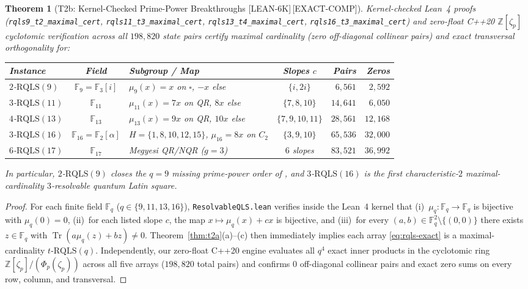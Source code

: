 \documentclass[11pt,reqno]{amsart}
\newtheorem{theorem}{Theorem}[section]
\theoremstyle{definition}
\newcommand{\ZZ}{\mathbb{Z}}
\newcommand{\FF}{\mathbb{F}}
\newcommand{\Tr}{\operatorname{Tr}}
\newcommand{\RQLS}{\mathrm{RQLS}}
\newcommand{\lid}[1]{{\footnotesize\nolinkurl{#1}}}
\newcommand{\tagL}{\textsf{\footnotesize[LEAN-6K]}}
\newcommand{\tagE}{\textsf{\footnotesize[EXACT-COMP]}}
\begin{document}
\begin{theorem}[T2b: Kernel-Checked Prime-Power Breakthroughs \tagL\,\tagE]
\label{thm:t2b}
Kernel-checked Lean~4 proofs (\lid{rqls9_t2_maximal_cert},
\lid{rqls11_t3_maximal_cert}, \lid{rqls13_t4_maximal_cert},
\lid{rqls16_t3_maximal_cert}) and zero-float C++20 $\ZZ[\zeta_p]$ cyclotomic
verification across all $198{,}820$ state pairs certify maximal cardinality (zero
off-diagonal collinear pairs) and exact transversal orthogonality for:
\begin{center}
\footnotesize
\setlength{\tabcolsep}{4pt}
\begin{tabularx}{\textwidth}{@{}l c >{\raggedright\arraybackslash}X c r r@{}}
\toprule
\textbf{Instance} & \textbf{Field} & \textbf{Subgroup / Map} & \textbf{Slopes $c$} & \textbf{Pairs} & \textbf{Zeros} \\
\midrule
$2$-$\RQLS(9)$ & $\FF_9 = \FF_3[i]$ & $\mu_9(x) = x$ on $\square$, $-x$ else & $\{i, 2i\}$ & $6{,}561$ & $2{,}592$ \\
$3$-$\RQLS(11)$ & $\FF_{11}$ & $\mu_{11}(x) = 7x$ on QR, $8x$ else & $\{7, 8, 10\}$ & $14{,}641$ & $6{,}050$ \\
$4$-$\RQLS(13)$ & $\FF_{13}$ & $\mu_{13}(x) = 9x$ on QR, $10x$ else & $\{7, 9, 10, 11\}$ & $28{,}561$ & $12{,}168$ \\
$3$-$\RQLS(16)$ & $\FF_{16} = \FF_2[\alpha]$ & $H = \{1,8,10,12,15\}$, $\mu_{16}=8x$ on $C_2$ & $\{3, 9, 10\}$ & $65{,}536$ & $32{,}000$ \\
$6$-$\RQLS(17)$ & $\FF_{17}$ & Megyesi QR/NQR ($g=3$) & $6$ slopes & $83{,}521$ & $36{,}992$ \\
\bottomrule
\end{tabularx}
\end{center}
In particular, $2$-$\RQLS(9)$ closes the $q=9$ missing prime-power order of
\cite{zhang2026rqls}, and $3$-$\RQLS(16)$ is the first characteristic-$2$ maximal-cardinality
$3$-resolvable quantum Latin square.
\end{theorem}

\begin{proof}
For each finite field $\FF_q$ ($q \in \{9, 11, 13, 16\}$), \lid{ResolvableQLS.lean}
verifies inside the Lean~4 kernel that (i)~$\mu_q : \FF_q \to \FF_q$ is bijective with
$\mu_q(0) = 0$, (ii)~for each listed slope $c$, the map $x \mapsto \mu_q(x) + c x$ is
bijective, and (iii)~for every $(a, b) \in \FF_q^2 \setminus \{(0,0)\}$ there exists
$z \in \FF_q$ with $\Tr(a \mu_q(z) + b z) \ne 0$. Theorem~\ref{thm:t2a}(a)--(c) then
immediately implies each array \eqref{eq:rqls-exact} is a maximal-cardinality
$t$-$\RQLS(q)$. Independently, our zero-float C++20 engine evaluates all $q^4$ exact inner
products in the cyclotomic ring $\ZZ[\zeta_p]/(\Phi_p(\zeta_p))$ across all five arrays
($198{,}820$ total pairs) and confirms $0$ off-diagonal collinear pairs and exact zero
sums on every row, column, and transversal.
\end{proof}
\end{document}
